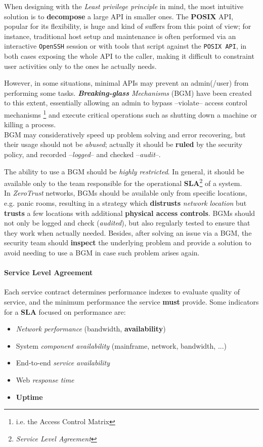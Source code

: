 When designing with the \textit{Least privilege principle} in mind,
the most intuitive solution is to \textbf{decompose} a large API in smaller ones.
The \textbf{POSIX} API, popular for its flexibility, is huge and kind of suffers from this point of view;
for instance, traditional host setup and maintenance is often performed via an interactive
\texttt{OpenSSH} session or with tools that script against the \texttt{POSIX API},
in both cases exposing the whole API to the caller,
making it difficult to constraint user activities only to the ones he actually needs.
\nl

However, in some situations, minimal APIs may prevent an admin(/user) from performing some tasks.
\textit{\textbf{Breaking-glass} Mechanisms} (BGM) have been created to this extent,
essentially allowing an admin to bypass {--}violate{--} access control
mechanisms \footnote{i.e. the Access Control Matrix} and execute critical
operations such as shutting down a machine or killing a process.\\
BGM may consideratively speed up problem solving and error recovering, but their usage should not be \textit{abused};
actually it should be \textbf{ruled} by the security policy,
and recorded {--}\textit{logged}{--} and checked {--}\textit{audit}{--}.

The ability to use a BGM should be \textit{highly restricted}. 
In general, it should be available only to the team responsible for the operational \textbf{SLA}\footnote{\textit{Service Level Agreement}} of a system.\\
In \textit{ZeroTrust} networks, BGMs should be available only from specific locations, e.g. panic rooms, 
resulting in a strategy which \textbf{distrusts} \textit{network location} but \textbf{trusts} a few locations
with additional \textbf{physical access controls}.
BGMs should not only be logged and check (\textit{audited}),
but also regularly tested to ensure that they work when actually needed.
Besides, after solving an issue via a BGM,
the security team should \textbf{inspect} the underlying problem and provide a solution to avoid needing to use a BGM in case such problem arises again.

\paragraph{Service Level Agreement}
Each service contract determines performance indexes to evaluate quality of service, and the minimum performance the service \textbf{must} provide.
Some indicators for a \textbf{SLA} focused on performance are:
\begin{itemize}
   \item \textit{Network performance} (bandwidth, \textbf{availability})
   \item System \textit{component availability} (mainframe, network, bandwidth, ...)
   \item End-to-end \textit{service availability}
   \item Web \textit{response time}
   \item \textbf{Uptime}
\end{itemize}

